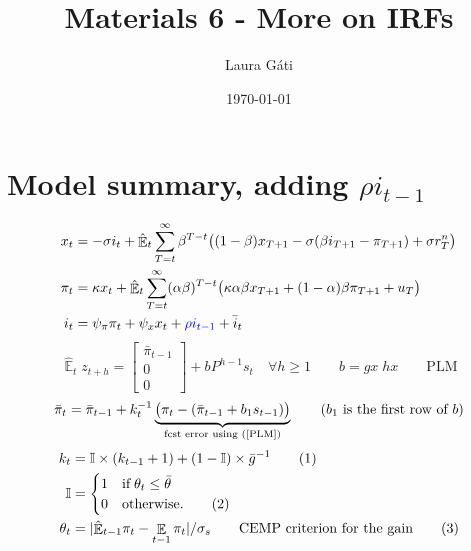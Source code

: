 \documentclass[11pt]{article}
\renewcommand{\[}{\begin{equation}}
\renewcommand{\]}{\end{equation}}
\DeclareMathOperator{\E}{\mathbb{E}}
\newcommand\numberthis{\addtocounter{equation}{1}\tag{\theequation}} %
\begin{document}
\linespread{1.0}

\title{Materials 6 - More on IRFs}
\author{Laura G\'ati} 
\date{\today}
\maketitle


\tableofcontents




\newpage
\section{Model summary, adding $\rho i_{t-1}$}
\begin{align}
x_t &=  -\sigma i_t +\hat{\E}_t \sum_{T=t}^{\infty} \beta^{T-t }\big( (1-\beta)x_{T+1} - \sigma(\beta i_{T+1} - \pi_{T+1}) +\sigma r_T^n \big)  \label{prestons18}  \\
\pi_t &= \kappa x_t +\hat{\E}_t \sum_{T=t}^{\infty} (\alpha\beta)^{T-t }\big( \kappa \alpha \beta x_{T+1} + (1-\alpha)\beta \pi_{T+1} + u_T\big) \label{prestons19}  \\
i_t &= \psi_{\pi}\pi_t + \psi_{x} x_t  + \textcolor{blue}{\rho i_{t-1}} + \bar{i}_t \label{TR}
\end{align}
\begin{equation}
\hat{\E}_t z_{t+h} =  \begin{bmatrix}\bar{\pi}_{t-1} \\ 0 \\ 0 \end{bmatrix}+ bP^{h-1}s_t  \quad \forall h\geq 1 \quad \quad b = gx \; hx \quad \quad \text{PLM} \label{PLM}
\end{equation}
\begin{equation}
\bar{\pi}_{t} = \bar{\pi}_{t-1} +k_t^{-1}\underbrace{\big(\pi_{t} -(\bar{\pi}_{t-1}+b_1s_{t-1}) \big)}_{\text{fcst error using (\ref{PLM})} } \quad \quad  \text{($b_1$ is the first row of $b$)}
\end{equation}
 \begin{align*}
k_t & = \mathbb{I}\times(k_{t-1}+1) + (1-\mathbb{I}) \times \bar{g}^{-1}  \label{gain} \numberthis\\
\mathbb{I} & = \begin{cases} 1 \quad \text{if} \; \theta_t \leq \bar{\theta}  \\ 0 \quad \text{otherwise.}\numberthis
\end{cases} \\
\theta_t & = |\hat{\E}_{t-1}\pi_t - \E_{t-1}\pi_t| / \sigma_s \quad \quad \text{CEMP criterion for the gain}\label{criterion}\numberthis
\end{align*}
\end{document}
